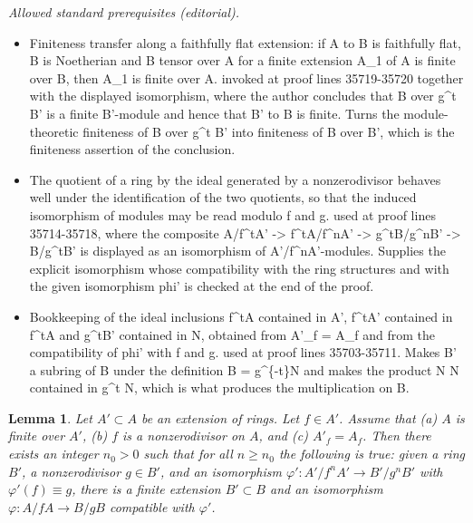 \documentclass[10pt,a4paper]{amsart}
\theoremstyle{plain}
\newtheorem{lemma}[subsection]{Lemma}
\theoremstyle{definition}
\theoremstyle{remark}
\numberwithin{equation}{subsection}
\begin{document}
\noindent\textit{Allowed standard prerequisites (editorial).}\begin{itemize}
\item Finiteness transfer along a faithfully flat extension: if A to B is faithfully flat, B is Noetherian and B tensor over A for a finite extension A\_1 of A is finite over B, then A\_1 is finite over A. invoked at proof lines 35719-35720 together with the displayed isomorphism, where the author concludes that B over g\textasciicircum{}t B' is a finite B'-module and hence that B' to B is finite. Turns the module-theoretic finiteness of B over g\textasciicircum{}t B' into finiteness of B over B', which is the finiteness assertion of the conclusion.
\item The quotient of a ring by the ideal generated by a nonzerodivisor behaves well under the identification of the two quotients, so that the induced isomorphism of modules may be read modulo f and g. used at proof lines 35714-35718, where the composite A/f\textasciicircum{}tA' -> f\textasciicircum{}tA/f\textasciicircum{}nA' -> g\textasciicircum{}tB/g\textasciicircum{}nB' -> B/g\textasciicircum{}tB' is displayed as an isomorphism of A'/f\textasciicircum{}nA'-modules. Supplies the explicit isomorphism whose compatibility with the ring structures and with the given isomorphism phi' is checked at the end of the proof.
\item Bookkeeping of the ideal inclusions f\textasciicircum{}tA contained in A', f\textasciicircum{}tA' contained in f\textasciicircum{}tA and g\textasciicircum{}tB' contained in N, obtained from A'\_f = A\_f and from the compatibility of phi' with f and g. used at proof lines 35703-35711. Makes B' a subring of B under the definition B = g\textasciicircum{}\{-t\}N and makes the product N N contained in g\textasciicircum{}t N, which is what produces the multiplication on B.
\end{itemize}\medskip
\begin{lemma}
\label{lemma-construct-extension}
Let $A' \subset A$ be an extension of rings. Let $f \in A'$.
Assume that (a) $A$ is finite over $A'$, (b) $f$ is a nonzerodivisor
on $A$, and (c) $A'_f = A_f$. Then there exists an integer $n_0 > 0$
such that for all $n \geq n_0$ the following is true: given a ring
$B'$, a nonzerodivisor $g \in B'$, and an isomorphism
$\varphi' : A'/f^n A' \to B'/g^n B'$ with $\varphi'(f) \equiv g$, there is a
finite extension $B' \subset B$ and an isomorphism
$\varphi : A/fA \to B/gB$ compatible with $\varphi'$.
\end{lemma}
\end{document}
